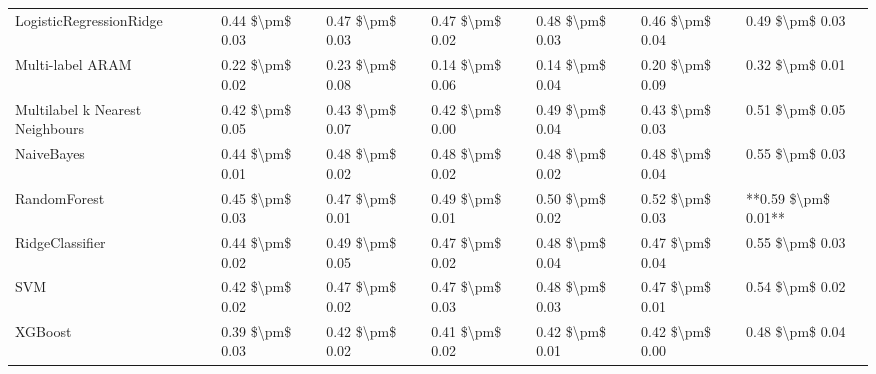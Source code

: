 \begin{tabular}{lllllll}
        LogisticRegressionRidge & 0.44 \$\textbackslash pm\$ 0.03 &           0.47 \$\textbackslash pm\$ 0.03 &       0.47 \$\textbackslash pm\$ 0.02 &        0.48 \$\textbackslash pm\$ 0.03 &                         0.46 \$\textbackslash pm\$ 0.04 &     0.49 \$\textbackslash pm\$ 0.03 \\
               Multi-label ARAM & 0.22 \$\textbackslash pm\$ 0.02 &           0.23 \$\textbackslash pm\$ 0.08 &       0.14 \$\textbackslash pm\$ 0.06 &        0.14 \$\textbackslash pm\$ 0.04 &                         0.20 \$\textbackslash pm\$ 0.09 &     0.32 \$\textbackslash pm\$ 0.01 \\
Multilabel k Nearest Neighbours & 0.42 \$\textbackslash pm\$ 0.05 &           0.43 \$\textbackslash pm\$ 0.07 &       0.42 \$\textbackslash pm\$ 0.00 &        0.49 \$\textbackslash pm\$ 0.04 &                         0.43 \$\textbackslash pm\$ 0.03 &     0.51 \$\textbackslash pm\$ 0.05 \\
                     NaiveBayes & 0.44 \$\textbackslash pm\$ 0.01 &           0.48 \$\textbackslash pm\$ 0.02 &       0.48 \$\textbackslash pm\$ 0.02 &        0.48 \$\textbackslash pm\$ 0.02 &                         0.48 \$\textbackslash pm\$ 0.04 &     0.55 \$\textbackslash pm\$ 0.03 \\
                   RandomForest & 0.45 \$\textbackslash pm\$ 0.03 &           0.47 \$\textbackslash pm\$ 0.01 &       0.49 \$\textbackslash pm\$ 0.01 &        0.50 \$\textbackslash pm\$ 0.02 &                         0.52 \$\textbackslash pm\$ 0.03 & **0.59 \$\textbackslash pm\$ 0.01** \\
                RidgeClassifier & 0.44 \$\textbackslash pm\$ 0.02 &           0.49 \$\textbackslash pm\$ 0.05 &       0.47 \$\textbackslash pm\$ 0.02 &        0.48 \$\textbackslash pm\$ 0.04 &                         0.47 \$\textbackslash pm\$ 0.04 &     0.55 \$\textbackslash pm\$ 0.03 \\
                            SVM & 0.42 \$\textbackslash pm\$ 0.02 &           0.47 \$\textbackslash pm\$ 0.02 &       0.47 \$\textbackslash pm\$ 0.03 &        0.48 \$\textbackslash pm\$ 0.03 &                         0.47 \$\textbackslash pm\$ 0.01 &     0.54 \$\textbackslash pm\$ 0.02 \\
                        XGBoost & 0.39 \$\textbackslash pm\$ 0.03 &           0.42 \$\textbackslash pm\$ 0.02 &       0.41 \$\textbackslash pm\$ 0.02 &        0.42 \$\textbackslash pm\$ 0.01 &                         0.42 \$\textbackslash pm\$ 0.00 &     0.48 \$\textbackslash pm\$ 0.04 \\
\bottomrule
\end{tabular}
